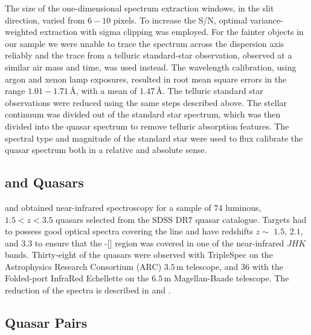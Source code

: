 The size of the one-dimensional spectrum extraction windows, in the slit direction, varied from $6-10$ pixels. 
To increase the S/N, optimal variance-weighted extraction with sigma clipping was employed. 
For the fainter objects in our sample we were unable to trace the spectrum across the dispersion axis reliably and the trace from a telluric standard-star observation, observed at a similar air mass and time, was used instead. 
The wavelength calibration, using argon and xenon lamp exposures, resulted in root mean square errors in the range $1.01-1.71$\,\AA, with a mean of $1.47$\,\AA. 
The telluric standard star observations were reduced using the same steps described above. 
The stellar continuum was divided out of the standard star spectrum, which was then divided into the quasar spectrum to remove telluric absorption features. 
The spectral type and magnitude of the standard star were used to flux calibrate the quasar spectrum both in a relative and absolute sense.

\subsection{\citet{shen12} and \citet{shen16a} Quasars}

\citet{shen16a} and \citet{shen12} obtained near-infrared spectroscopy for a sample of $74$ luminous, $1.5 < z < 3.5$ quasars selected from the SDSS DR$7$ quasar catalogue. 
Targets had to possess good optical spectra covering the  line and have redshifts $z\sim$ $1.5$, $2.1$, and $3.3$ to ensure that the \hbns-[] region was covered in one of the near-infrared $JHK$ bands.
Thirty-eight of the quasars were observed with TripleSpec \citep{wilson04} on the Astrophysics Research Consortium (ARC) $3.5$\,m telescope, and $36$ with the Folded-port InfraRed Echellette \citep[FIRE;][]{simcoe10} on the $6.5$\,m Magellan-Baade telescope.
The reduction of the spectra is described in \citet{shen16a} and \citet{shen12}. 

\subsection{Quasar Pairs}


